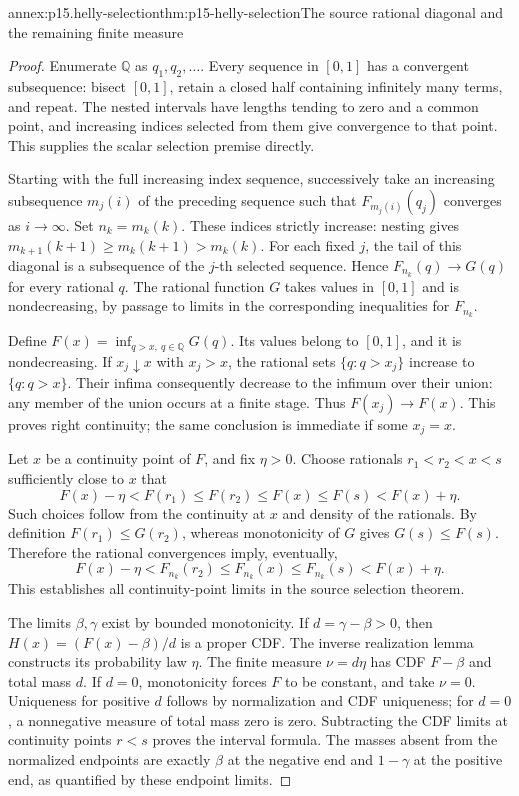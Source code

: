 \begin{annexitem}{annex:p15.helly-selection}{thm:p15-helly-selection}{The source rational diagonal and the remaining finite measure}
\begin{proof}
Enumerate \(\mathbb Q\) as \(q_1,q_2,\ldots\).
Every sequence in \([0,1]\) has a convergent subsequence:
bisect \([0,1]\), retain a closed half containing infinitely
many terms, and repeat. The nested intervals have lengths
tending to zero and a common point, and increasing indices
selected from them give convergence to that point.
This supplies the scalar selection premise directly.

Starting with the full increasing index sequence, successively
take an increasing subsequence \(m_j(i)\) of the preceding
sequence such that \(F_{m_j(i)}(q_j)\) converges as \(i\to\infty\).
Set \(n_k=m_k(k)\). These indices strictly increase: nesting
gives \(m_{k+1}(k+1)\geq m_k(k+1)>m_k(k)\).
For each fixed \(j\), the tail of this diagonal is a
subsequence of the \(j\)-th selected sequence. Hence
\(F_{n_k}(q)\to G(q)\) for every rational \(q\).
The rational function \(G\) takes values in \([0,1]\) and
is nondecreasing, by passage to limits in the corresponding
inequalities for \(F_{n_k}\).

Define \(F(x)=\inf_{q>x,\ q\in\mathbb Q}G(q)\).
Its values belong to \([0,1]\), and it is nondecreasing.
If \(x_j\downarrow x\) with \(x_j>x\), the rational sets
\(\{q:q>x_j\}\) increase to \(\{q:q>x\}\).
Their infima consequently decrease to the infimum over their
union: any member of the union occurs at a finite stage.
Thus \(F(x_j)\to F(x)\). This proves right continuity;
the same conclusion is immediate if some \(x_j=x\).

Let \(x\) be a continuity point of \(F\), and fix \(\eta>0\).
Choose rationals \(r_1<r_2<x<s\) sufficiently close to \(x\)
that
\[
 F(x)-\eta<F(r_1)\leq F(r_2)\leq F(x)\leq F(s)<F(x)+\eta.
\]
Such choices follow from the continuity at \(x\) and density
of the rationals. By definition \(F(r_1)\leq G(r_2)\),
whereas monotonicity of \(G\) gives \(G(s)\leq F(s)\).
Therefore the rational convergences imply, eventually,
\[
 F(x)-\eta<F_{n_k}(r_2)\leq F_{n_k}(x)
                       \leq F_{n_k}(s)<F(x)+\eta.
\]
This establishes all continuity-point limits in the source
selection theorem.

The limits \(\beta,\gamma\) exist by bounded monotonicity.
If \(d=\gamma-\beta>0\), then
\(H(x)=(F(x)-\beta)/d\) is a proper CDF. The inverse
realization lemma constructs its probability law \(\eta\).
The finite measure \(\nu=d\eta\) has CDF \(F-\beta\)
and total mass \(d\). If \(d=0\), monotonicity forces \(F\)
to be constant, and take \(\nu=0\).
Uniqueness for positive \(d\) follows by normalization and
CDF uniqueness; for \(d=0\), a nonnegative measure of total
mass zero is zero. Subtracting the CDF limits at continuity
points \(r<s\) proves the interval formula.
The masses absent from the normalized endpoints are exactly
\(\beta\) at the negative end and \(1-\gamma\) at the positive
end, as quantified by these endpoint limits.
\end{proof}
\end{annexitem}

